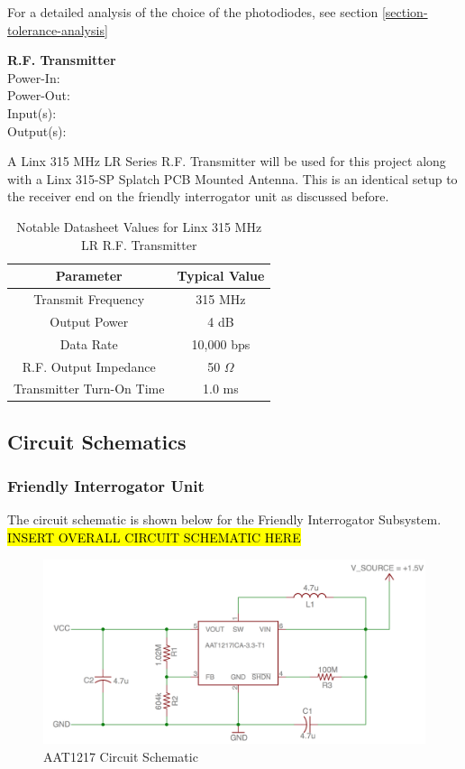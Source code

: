 \documentclass[letterpaper,10pt]{article}
\begin{document}
\begin{spacing}{1.15}
For a detailed analysis of the choice of the photodiodes, see section \ref{section-tolerance-analysis}

\normalsize\textbf{R.F. Transmitter}\\
Power-In: \\
Power-Out: \\ 
Input(s): \\ 
Output(s):

A Linx 315 MHz LR Series R.F. Transmitter will be used for this project along with a Linx 315-SP Splatch PCB Mounted Antenna. This is an identical setup to the receiver end on the friendly interrogator unit as discussed before.  

\begin{table}[htbp]
	\centering
	\begin{tabular}{c|c}	%
		\toprule	%
		Parameter & Typical Value \\
		\midrule
		Transmit Frequency & 315 MHz \\ 
		Output Power & 4 dB \\
		Data Rate & 10,000 bps \\
		R.F. Output Impedance & 50 $\Omega$ \\
		Transmitter Turn-On Time & 1.0 ms  \\
		\bottomrule	%
	\end{tabular}%
	\caption{Notable Datasheet Values for Linx 315 MHz LR R.F. Transmitter}
	\label{tab:table2}	%
\end{table}



\subsection{Circuit Schematics}

\subsubsection{Friendly Interrogator Unit}
The circuit schematic is shown below for the Friendly Interrogator Subsystem.
\hl{INSERT OVERALL CIRCUIT SCHEMATIC HERE}
\begin{figure} [H]
	\centering
	\includegraphics[scale=0.35]{Voltage_Converter_Schematic.png}
	\caption{AAT1217 Circuit Schematic\label{fig:voltage-converter-schematic}}
\end{figure}


\end{spacing}
\end{document}
